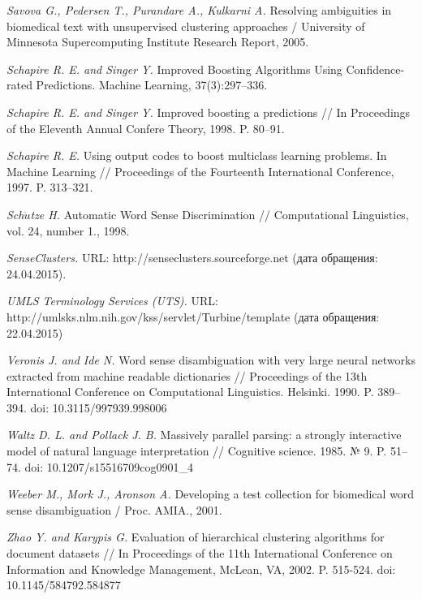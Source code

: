 \documentclass{article}
\begin{document}
\begin{articletext}
\begin{thebibliography}{9}
\textit{Savova G., Pedersen T., Purandare A., Kulkarni A. }Resolving ambiguities in biomedical text with unsupervised clustering approaches / University of Minnesota Supercomputing Institute Research Report, 2005.

\textit{Schapire R. E. and Singer Y. } Improved Boosting   Algorithms   Using   Confidence-rated
Predictions. Machine Learning, 37(3):297–336.                          

\textit{Schapire R. E. and Singer Y. }Improved boosting a predictions // In Proceedings of the Eleventh Annual Confere Theory, 1998. P. 80–91. 

\textit{Schapire R. E. }Using output codes to boost multiclass learning problems. In Machine Learning // Proceedings of the Fourteenth International Conference, 1997. P. 313–321. 

\textit{Sch$\ddot{u}$tze H. }Automatic Word Sense Discrimination // Computational Linguistics, vol. 24, number 1., 1998.

\textit{SenseClusters. }  \newline URL: http://senseclusters.sourceforge.net (дата обращения: 24.04.2015).

\textit{UMLS Terminology Services (UTS).} URL: http://umlsks.nlm.nih.gov/kss/servlet/Turbine/\newline template (дата обращения: 22.04.2015)

\textit{Veronis J. and Ide N. }Word  sense  disambiguation  with  very  large neural  networks  extracted  from machine readable dictionaries // Proceedings of the 13th International Conference on Computational Linguistics. Helsinki. 1990. P. 389–394. doi: 10.3115/997939.998006

\textit{Waltz D. L. and  Pollack J. B. }Massively parallel parsing: a strongly interactive  model  of  natural  language interpretation // Cognitive science. 1985. № 9. P. 51–74. doi: 10.1207/s15516709cog0901\_4
                     
\textit{Weeber M.,  Mork J.,  Aronson A. }Developing a test collection for biomedical word sense disambiguation / Proc. AMIA., 2001.

\textit{Zhao Y. and  Karypis G. }Evaluation of hierarchical clustering algorithms for document datasets // In Proceedings of the 11th International Conference on Information and Knowledge Management, McLean, VA, 2002. P. 515-524. doi: 10.1145/584792.584877



\end{thebibliography}
\end{articletext}
\end{document}
